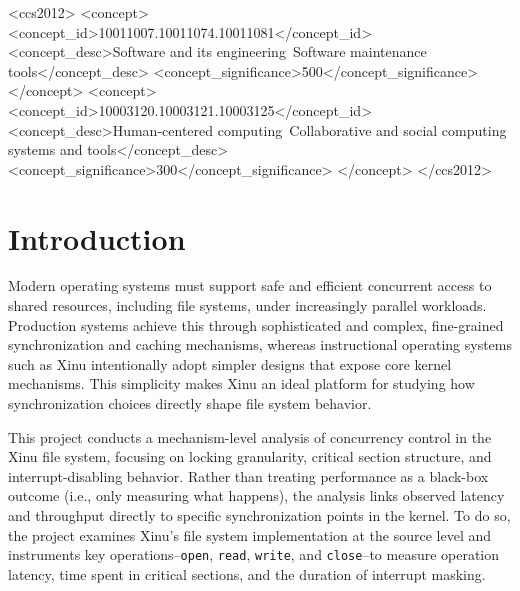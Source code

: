 \documentclass[sigconf]{acmart}
\begin{document}
\begin{CCSXML}
<ccs2012>
<concept>
<concept_id>10011007.10011074.10011081</concept_id>
<concept_desc>Software and its engineering~Software maintenance tools</concept_desc>
<concept_significance>500</concept_significance>
</concept>
<concept>
<concept_id>10003120.10003121.10003125</concept_id>
<concept_desc>Human-centered computing~Collaborative and social computing systems and tools</concept_desc>
<concept_significance>300</concept_significance>
</concept>
</ccs2012>
\end{CCSXML}










\maketitle






\section{Introduction}
\label{sec:intro}

Modern operating systems must support safe and efficient concurrent access to shared resources, including file systems, under increasingly parallel workloads. Production systems achieve this through sophisticated and complex, fine-grained synchronization and caching mechanisms, whereas instructional operating systems such as Xinu intentionally adopt simpler designs that expose core kernel mechanisms. This simplicity makes Xinu an ideal platform for studying how synchronization choices directly shape file system behavior.

This project conducts a mechanism-level analysis of concurrency control in the Xinu file system, focusing on locking granularity, critical section structure, and interrupt-disabling behavior. Rather than treating performance as a black-box outcome (i.e., only measuring what happens), the analysis links observed latency and throughput directly to specific synchronization points in the kernel. To do so, the project examines Xinu’s file system implementation at the source level and instruments key operations--\texttt{open}, \texttt{read}, \texttt{write}, and \texttt{close}--to measure operation latency, time spent in critical sections, and the duration of interrupt masking.
\end{document}
